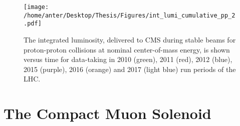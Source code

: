 \begin{figure}[!h]
 \begin{center}
 \vspace*{4mm} 
 \texttt{[image: /home/anter/Desktop/Thesis/Figures/int\_lumi\_cumulative\_pp\_2.pdf]}\\
 \vspace*{5mm}
 \caption[Lumi]{The integrated luminosity, delivered to CMS during stable beams for proton-proton collisions at nominal center-of-mass energy, is shown versus time for data-taking in 2010 (green), 2011 (red), 2012 (blue), 2015 (purple), 2016 (orange) and 2017 (light blue) run periods of the LHC.\footnotemark}
 \label{fig:lumi}
 \end{center}
\end{figure}

\section{The Compact Muon Solenoid}

